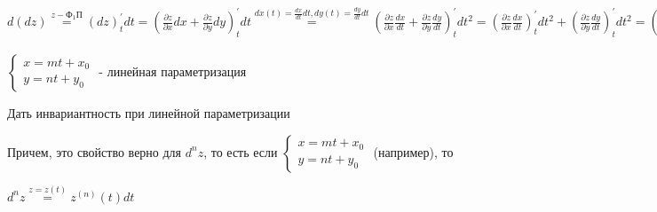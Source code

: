 \documentclass[12pt]{article}
\begin{document}
    $\displaystyle d(dz) \stackrel{z - \text{Ф}_1\text{П}}{=} (dz)^\prime_t dt =
    \left(\frac{\partial z}{\partial x} dx + \frac{\partial z}{\partial y}dy\right)^\prime_t dt
    \stackrel{dx(t) = \frac{dx}{dt}dt, dy(t) = \frac{dy}{dt}dt}{=}
    \left(\frac{\partial z}{\partial x}\frac{dx}{dt} + \frac{\partial z}{\partial y}\frac{dy}{dt}\right)^{\prime}_t dt^2 =
    \left(\frac{\partial z}{\partial x}\frac{dx}{dt}\right)^{\prime}_t dt^2 + \left(\frac{\partial z}{\partial y}\frac{dy}{dt}\right)^{\prime}_t dt^2 =
    \left(\left(\frac{\partial z}{\partial x}\right)^{\prime}_t\frac{dx}{dt} + \frac{\partial z}{\partial x}\left(\frac{dx}{dt}\right)^{\prime}_t\right) dt^2 +
    \left(\left(\frac{\partial z}{\partial y}\right)^{\prime}_t\frac{dy}{dt} + \frac{\partial z}{\partial y}\left(\frac{dy}{dt}\right)^{\prime}_t\right) dt^2 =
    \left(\frac{\partial^2 z}{\partial x^2} \left(\frac{dx}{dt}\right)^2 + \frac{\partial z}{\partial x} \frac{d^2 x}{dt^2}\right) dt^2 +
    \left(\frac{\partial^2 z}{\partial y^2} \left(\frac{dy}{dt}\right)^2 + \frac{\partial z}{\partial y} \frac{d^2 y}{dt^2}\right) dt^2 +
    \left(\frac{\partial^2 z}{\partial x \partial y}\frac{dy}{dt}\frac{dx}{dt} + \frac{\partial^2 z}{\partial y \partial x}\frac{dx}{dt}\frac{dy}{dt}\right) dt^2 =
    \frac{\partial^2 z}{\partial x^2} dx^2 + \frac{\partial z}{\partial x} d^2 x +
    \frac{\partial^2 z}{\partial y^2} dy^2 + \frac{\partial z}{\partial y} d^2 y +
    2 \frac{\partial^2 z}{\partial x \partial y}dydx =
    \left(\frac{\partial}{\partial x} + \frac{\partial}{\partial y}\right)^2 z \frac{\partial z}{\partial x} d^2 x + \frac{\partial z}{\partial y} d^2 y
    $\displaystyle 

    $\displaystyle \begin{cases}
        x = mt + x_0 \\
         y = nt + y_0
    \end{cases}$ - линейная параметризация

    \Lab Дать инвариантность при линейной параметризации

    Причем, это свойство верно для $\displaystyle d^n z$, то есть если $\displaystyle \begin{cases}
        x = mt + x_0 \\
         y = nt + y_0
    \end{cases}$ (например), то

    $\displaystyle d^n z \stackrel{z = z(t)}{=} z^{(n)}(t)dt$

    \vspace{8mm}
    
\end{document}

